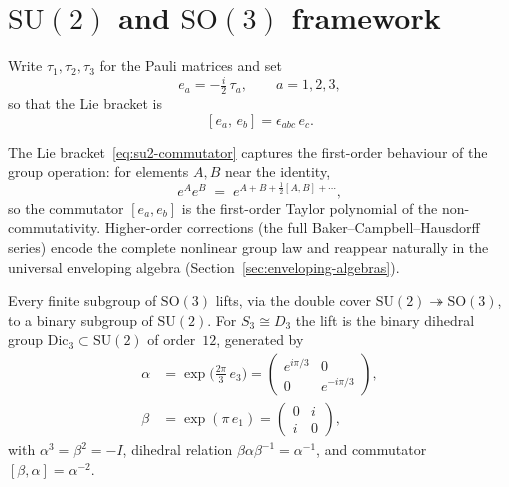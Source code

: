 
\section{$\mathrm{SU}(2)$ and $\mathrm{SO}(3)$ framework}
\label{sec:su2-so3}

\begin{definition}
\label{def:su2-basis}
Write $\tau_1,\tau_2,\tau_3$ for the Pauli matrices and set
\begin{equation}\label{eq:su2-basis}
  e_a=-\tfrac{i}{2}\,\tau_a,\qquad a=1,2,3,
\end{equation}
so that the Lie bracket is
\begin{equation}\label{eq:su2-commutator}
  [e_a,\,e_b]=\epsilon_{abc}\,e_c.
\end{equation}
\end{definition}

\begin{remark}
\label{rem:first-order-taylor}
The Lie bracket~\eqref{eq:su2-commutator} captures the first-order
behaviour of the group operation: for elements $A,B$ near the identity,
\[
  e^A e^B \;=\; e^{A+B+\tfrac{1}{2}[A,B]+\cdots},
\]
so the commutator $[e_a,e_b]$ is the first-order Taylor polynomial of
the non-commutativity.  Higher-order corrections (the full
Baker--Campbell--Hausdorff series) encode the complete nonlinear group
law and reappear naturally in the universal enveloping algebra
(Section~\ref{sec:enveloping-algebras}).
\end{remark}

\begin{definition}
\label{def:su2-generators}
Every finite subgroup of $\mathrm{SO}(3)$ lifts, via the double cover
$\mathrm{SU}(2)\twoheadrightarrow\mathrm{SO}(3)$, to a binary subgroup of
$\mathrm{SU}(2)$.  For $S_3\cong D_3$ the lift is the binary dihedral group
$\mathrm{Dic}_3\subset\mathrm{SU}(2)$ of order~$12$, generated by
\begin{align}
  \alpha &= \exp\!\bigl(\tfrac{2\pi}{3}\,e_3\bigr)
  = \begin{pmatrix}e^{i\pi/3}&0\\[2pt]0&e^{-i\pi/3}\end{pmatrix},
  \label{eq:su2-3cycle}\\[4pt]
  \beta &= \exp(\pi\,e_1)
  = \begin{pmatrix}0&i\\[2pt]i&0\end{pmatrix},
  \label{eq:su2-2cycle}
\end{align}
with $\alpha^3=\beta^2=-I$, dihedral relation
$\beta\alpha\beta^{-1}=\alpha^{-1}$, and commutator
$[\beta,\alpha]=\alpha^{-2}$.
\end{definition}

